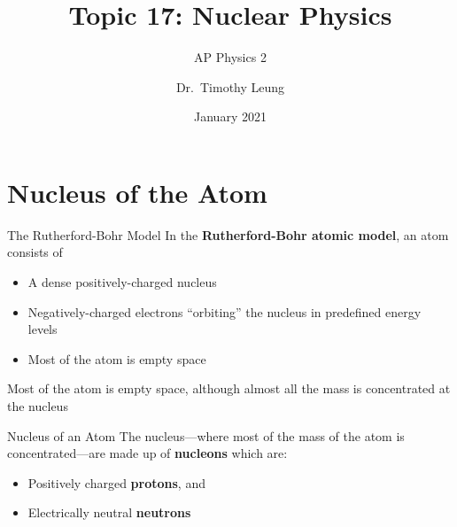 \documentclass[12pt,compress,aspectratio=169]{beamer}
\title{Topic 17: Nuclear Physics}
\subtitle{AP Physics 2}
\author{Dr.\ Timothy Leung}
\institute{Olympiads School}
\date{January 2021}
\newcommand{\pic}[2]{\texttt{[image: \#2]}}
\begin{document}
\begin{frame}
  \titlepage
\end{frame}



\section{Nucleus of the Atom}

%


\begin{frame}{The Rutherford-Bohr Model}
  In the \textbf{Rutherford-Bohr atomic model}, an atom consists of
  \begin{itemize}
  \item A dense positively-charged nucleus
  \item Negatively-charged electrons ``orbiting'' the nucleus in predefined
    energy levels
  \item Most of the atom is empty space
  \end{itemize}
  Most of the atom is empty space, although almost all the mass is concentrated
  at the nucleus
\end{frame}



\begin{frame}{Nucleus of an Atom}
  The nucleus---where most of the mass of the atom is concentrated---are made
  up of \textbf{nucleons} which are:
  \begin{itemize}
  \item Positively charged \textbf{protons}, and 
  \item Electrically neutral \textbf{neutrons}
  \end{itemize}
\end{frame}
\end{document}
